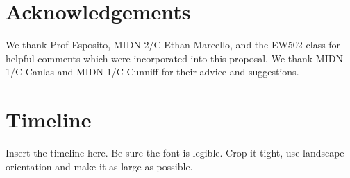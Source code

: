 \documentclass[onecolumn,10pt]{IEEEtran}
\newcommand{\myroot}{../}
\begin{document}
\section*{Acknowledgements}
We thank Prof Esposito, MIDN 2/C Ethan Marcello, and the EW502 class for helpful comments which were incorporated into this proposal. We thank MIDN 1/C Canlas and MIDN 1/C Cunniff for their advice and suggestions. 



%





\appendix
\section{Timeline}\label{app:gantt}
Insert the timeline here. Be sure the font is legible. Crop it tight, use landscape orientation and make it as large as possible.

%
%
\end{document}
